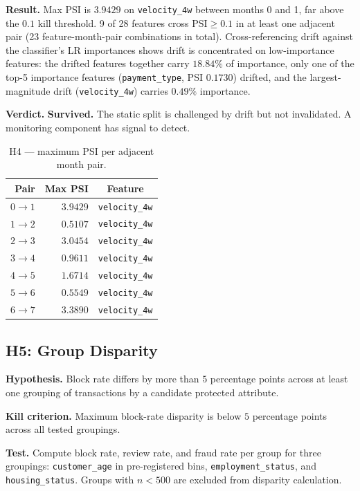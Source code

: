 \documentclass[conference]{IEEEtran}
\begin{document}
\textbf{Result.} Max PSI is $3.9429$ on \texttt{velocity\_4w} between months
0 and 1, far above the $0.1$ kill threshold. 9 of 28 features cross
$\text{PSI} \geq 0.1$ in at least one adjacent pair (23 feature-month-pair
combinations in total). Cross-referencing
drift against the classifier's LR importances shows drift is concentrated
on low-importance features: the drifted features together carry $18.84\%$
of importance, only one of the top-5 importance features
(\texttt{payment\_type}, PSI $0.1730$) drifted, and the largest-magnitude
drift (\texttt{velocity\_4w}) carries $0.49\%$ importance.

\textbf{Verdict.} \textbf{Survived.} The static split is challenged by
drift but not invalidated. A monitoring component has signal to detect.

\begin{table}[!t]
\caption{H4 — maximum PSI per adjacent month pair.}
\label{tab:h4}
\centering
\small
\begin{tabular}{rrc}
\toprule
Pair & Max PSI & Feature \\
\midrule
$0 \to 1$ & $3.9429$ & \texttt{velocity\_4w} \\
$1 \to 2$ & $0.5107$ & \texttt{velocity\_4w} \\
$2 \to 3$ & $3.0454$ & \texttt{velocity\_4w} \\
$3 \to 4$ & $0.9611$ & \texttt{velocity\_4w} \\
$4 \to 5$ & $1.6714$ & \texttt{velocity\_4w} \\
$5 \to 6$ & $0.5549$ & \texttt{velocity\_4w} \\
$6 \to 7$ & $3.3890$ & \texttt{velocity\_4w} \\
\bottomrule
\end{tabular}
\end{table}

\subsection{H5: Group Disparity}

\textbf{Hypothesis.} Block rate differs by more than $5$ percentage points
across at least one grouping of transactions by a candidate protected
attribute.

\textbf{Kill criterion.} Maximum block-rate disparity is below $5$
percentage points across all tested groupings.

\textbf{Test.} Compute block rate, review rate, and fraud rate per group for
three groupings: \texttt{customer\_age} in pre-registered bins,
\texttt{employment\_status}, and \texttt{housing\_status}. Groups with $n <
500$ are excluded from disparity calculation.
\end{document}
